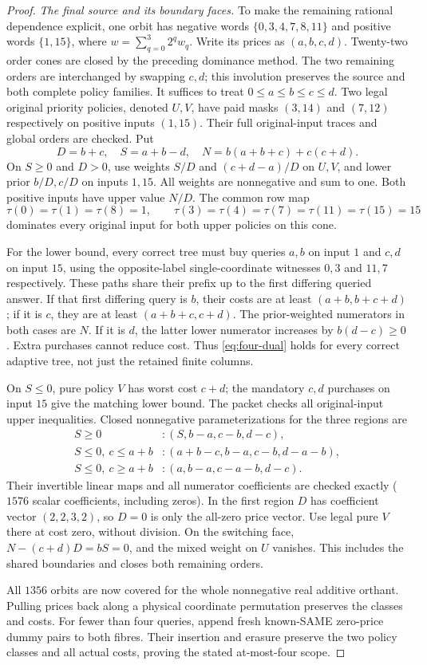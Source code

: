 \begin{proof}
\emph{The final source and its boundary faces.}
To make the remaining rational dependence explicit, one orbit has
negative words $\{0,3,4,7,8,11\}$ and positive words $\{1,15\}$,
where $w=\sum_{q=0}^3 2^qw_q$. Write its prices as $(a,b,c,d)$.
Twenty-two order cones are closed by the preceding dominance method.
The two remaining orders are interchanged by swapping $c,d$; this
involution preserves the source and both complete policy families.
It suffices to treat $0\leq a\leq b\leq c\leq d$.
Two legal original priority policies, denoted $U,V$, have paid masks
$(3,14)$ and $(7,12)$ respectively on positive inputs $(1,15)$.
Their full original-input traces and global orders are checked.
Put
\[
 D=b+c,\quad S=a+b-d,\quad
 N=b(a+b+c)+c(c+d).
\]
On $S\geq0$ and $D>0$, use weights $S/D$ and $(c+d-a)/D$
on $U,V$, and lower prior $b/D,c/D$ on inputs $1,15$.
All weights are nonnegative and sum to one. Both positive inputs
have upper value $N/D$. The common row map
\[
 \tau(0)=\tau(1)=\tau(8)=1,\qquad
 \tau(3)=\tau(4)=\tau(7)=\tau(11)=\tau(15)=15
\]
dominates every original input for both upper policies on this cone.

For the lower bound, every correct tree must buy queries $a,b$ on
input $1$ and $c,d$ on input $15$, using the opposite-label
single-coordinate witnesses $0,3$ and $11,7$ respectively. These
paths share their prefix up to the first differing queried answer.
If that first differing query is $b$, their costs are at least
$(a+b,b+c+d)$; if it is $c$, they are at least $(a+b+c,c+d)$.
The prior-weighted numerators in both cases are $N$. If it is $d$,
the latter lower numerator increases by $b(d-c)\geq0$. Extra purchases
cannot reduce cost. Thus \eqref{eq:four-dual} holds for every correct
adaptive tree, not just the retained finite columns.

On $S\leq0$, pure policy $V$ has worst cost $c+d$; the mandatory
$c,d$ purchases on input $15$ give the matching lower bound. The
packet checks all original-input upper inequalities. Closed
nonnegative parameterizations for the three regions are
\begin{align*}
 S\geq0 &: (S,b-a,c-b,d-c),\\
 S\leq0,\ c\leq a+b &: (a+b-c,b-a,c-b,d-a-b),\\
 S\leq0,\ c\geq a+b &: (a,b-a,c-a-b,d-c).
\end{align*}
Their invertible linear maps and all numerator coefficients are
checked exactly ($1576$ scalar coefficients, including zeros).
In the first region $D$ has coefficient vector $(2,2,3,2)$, so
$D=0$ is only the all-zero price vector. Use legal pure $V$ there
at cost zero, without division. On the switching face,
$N-(c+d)D=bS=0$, and the mixed weight on $U$ vanishes. This
includes the shared boundaries and closes both remaining orders.

All $1356$ orbits are now covered for the whole nonnegative real
additive orthant. Pulling prices back along a physical coordinate
permutation preserves the classes and costs. For fewer than four
queries, append fresh known-SAME zero-price dummy pairs to both
fibres. Their insertion and erasure preserve the two policy classes
and all actual costs, proving the stated at-most-four scope.
\end{proof}

